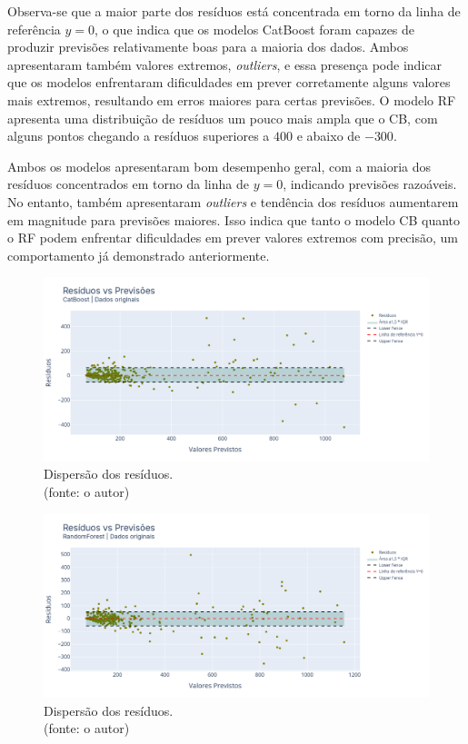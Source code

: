 Observa-se que a maior parte dos resíduos está concentrada em torno da linha de referência $y=0$, o que indica que os modelos CatBoost foram capazes de produzir previsões relativamente boas para a maioria dos dados. Ambos apresentaram também valores extremos, \textit{outliers}, e essa presença pode indicar que os modelos enfrentaram dificuldades em prever corretamente alguns valores mais extremos, resultando em erros maiores para certas previsões. O modelo RF apresenta uma distribuição de resíduos um pouco mais ampla que o CB, com alguns pontos chegando a resíduos superiores a $400$ e abaixo de $-300$.

Ambos os modelos apresentaram bom desempenho geral, com a maioria dos resíduos concentrados em torno da linha de $y=0$, indicando previsões razoáveis. No entanto, também apresentaram \textit{outliers} e tendência dos resíduos aumentarem em magnitude para previsões maiores. Isso indica que tanto o modelo CB quanto o RF podem enfrentar dificuldades em prever valores extremos com precisão, um comportamento já demonstrado anteriormente.

\begin{figure}[!h]
\centering
\includegraphics[scale=0.33]{Figuras/jequiti/resultados/CB_WFV_ORIG_RESID_x_PREV.png}
\caption{Dispersão dos resíduos.\\(fonte: o autor)}
\label{fig:jequiti_CB_WFV_ORIG_RESID_x_PREV}
\end{figure}

\begin{figure}[!h]
\centering
\includegraphics[scale=0.33]{Figuras/jequiti/resultados/RF_WFV_ORIG_RESID_x_PREV.png}
\caption{Dispersão dos resíduos.\\(fonte: o autor)}
\label{fig:jequiti_RF_WFV_ORIG_RESID_x_PREV}
\end{figure}
\clearpage

